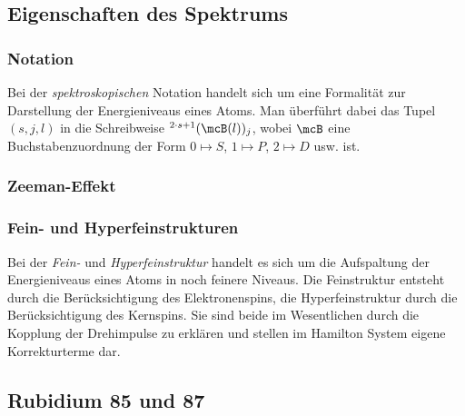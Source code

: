 \documentclass[../main.tex]{subfiles}
\begin{document}
    \subsection{Eigenschaften des Spektrums}
        \subsubsection*{Notation}
            Bei der \emph{spektroskopischen} Notation handelt sich um eine Formalität zur Darstellung der Energieniveaus eines Atoms. Man überführt dabei das Tupel $(s,j,l)$ in die Schreibweise $^{2\cdot s + 1}(\mcB(l))_j$, wobei $\mcB$ eine Buchstabenzuordnung der Form $0\mapsto S$, $1\mapsto P$, $2\mapsto D$ usw. ist. 

        \subsubsection*{Zeeman-Effekt}


			

        \subsubsection*{Fein- und Hyperfeinstrukturen}
            Bei der \emph{Fein-} und \emph{Hyperfeinstruktur} handelt es sich um die Aufspaltung der Energieniveaus eines Atoms in noch feinere Niveaus. Die Feinstruktur entsteht durch die Berücksichtigung des Elektronenspins, die Hyperfeinstruktur durch die Berücksichtigung des Kernspins. Sie sind beide im Wesentlichen durch die Kopplung der Drehimpulse zu erklären und stellen im Hamilton System eigene Korrekturterme dar. 

    \subsection{Rubidium 85 und 87}
\end{document}

